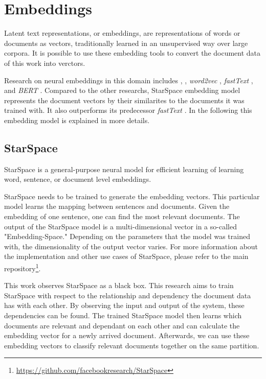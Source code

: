 \section{Embeddings}
\label{sec:embeddings}
Latent text representations, or embeddings, are representations of words or documents as vectors, traditionally learned in an unsupervised way over large corpora. It is possible to use these embedding tools to convert the document data of this work into verctors. 

Research on neural embeddings in this domain includes \cite{bengioNeuralProbabilisticLanguage2003}, 
\cite{collobertNaturalLanguageProcessing2011}, \emph{word2vec} \cite{goldbergWord2vecExplainedDeriving2014}, \emph{fastText} \cite{joulinFastTextZipCompressing2016}, and \emph{BERT} \cite{devlinBERTPretrainingDeep2019}. Compared to the other researchs, StarSpace embedding model represents the document vectors by their similarites to the documents it was trained with. It also outperforms its predecessor \emph{fastText} \cite{wuStarSpaceEmbedAll2017}. In the following this embedding model is explained in more details.

\subsection{StarSpace}
\label{subsec:StarSpace}
StarSpace \cite{wuStarSpaceEmbedAll2017} is a general-purpose neural model for efficient learning of learning word, sentence, or document level embeddings.


StarSpace needs to be trained to generate the embedding vectors. This particular model learns the mapping between sentences and documents. Given the embedding of one sentence, one can find the most relevant documents. The output of the StarSpace model is a multi-dimensional vector in a so-called "Embedding-Space." Depending on the parameters that the model was trained with, the dimensionality of the output vector varies. For more information about the implementation and other use cases of StarSpace, please refer to the main repository\footnote{\url{https://github.com/facebookresearch/StarSpace}}.


This work observes StarSpace as a black box. This research aims to train StarSpace with respect to the relationship and dependency the document data has with each other. By observing the input and output of the system, these dependencies can be found. The trained StarSpace model then learns which documents are relevant and dependant on each other and can calculate the embedding vector for a newly arrived document. Afterwards, we can use these embedding vectors to classify relevant documents together on the same partition.

